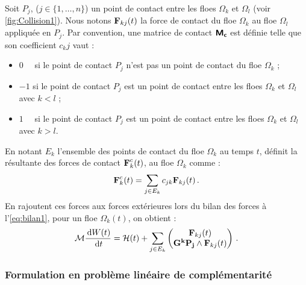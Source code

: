 Soit $P_j$, ($j \in \{1,\ldots,n\}$) un point de contact entre les floes $\Omega_k$ et $\Omega_l$ (voir \cref{fig:Collision1}). Nous notons $\bm{\mathrm{F}}_{kj}(t)$ la force de contact du floe $\Omega_k$ au floe $\Omega_l$ appliquée en $P_j$. Par convention, une matrice de contact $\bm{\mathsf{M_c}}$ est définie telle que son coefficient $c_kj$ vaut :
\begin{itemize}
    \item $0\,\,\,\,\,\, $ si le point de contact $P_j$ n’est pas un point de contact du floe $\Omega_k$ ;
    \item $-1$ si le point de contact $P_j$ est un point de contact entre les floes $\Omega_k$ et $\Omega_l$ avec $k < l$ ;
    \item $1\,\,\,\,\,\, $ si le point de contact $P_j$ est un point de contact entre les floes $\Omega_k$ et $\Omega_l$ avec $k > l$.
\end{itemize}
En notant $E_k$ l’ensemble des points de contact du floe $\Omega_k$ au temps $t$, \parencite[p.26]{rabatel2015thesis} définit la résultante des forces de contact $\bm{\mathrm{F}}^c_k(t)$, au floe $\Omega_k$ comme :
$$
\bm{\mathrm{F}}^c_k(t) = \sum_{j \in E_k} c_{jk} \bm{\mathrm{F}}_{kj}(t) \,.
$$
En rajoutent ces forces aux forces extérieures lors du bilan des forces à l'\cref{eq:bilan1}, pour un floe $\Omega_k(t)$, on obtient :
\begin{align} \label{eq:bilan4}
    \mathcal{M} \frac{\diff W(t)}{\diff t} = \mathcal{H}(t) + \sum_{j \in E_k} \begin{pmatrix}
        \bvec{F}_{kj}(t) \\ \bvec{G^kP_j} \wedge \bvec{F}_{kj}(t) 
    \end{pmatrix} \,.
\end{align}


\subsubsection{Formulation en problème linéaire de complémentarité}


